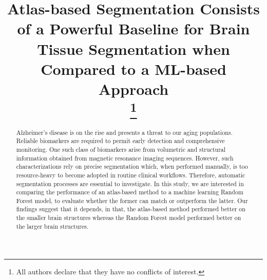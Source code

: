 \documentclass[conference]{IEEEtran}
\begin{document}
\title{Atlas-based Segmentation Consists of a Powerful Baseline for Brain Tissue Segmentation when Compared to a ML-based Approach\\
\thanks{All authors declare that they have no conflicts of interest.}
}

\begin{comment}
\author{\IEEEauthorblockN{Antoine Biebuyck}
\IEEEauthorblockA{\textit{ARTORG Center for BME Research} \\
\textit{Université de Berne}\\
Berne, Suisse \\
antoine.biebuyck@students.unibe.ch}
\and
\IEEEauthorblockN{Nathan Hoffman}
\IEEEauthorblockA{\textit{ARTORG Center for BME Research} \\
\textit{Universität Bern}\\
Bern, Schweiz \\
nathan.hoffman@students.unibe.ch}
\and
\IEEEauthorblockN{Sandro Scherrer}
\IEEEauthorblockA{\textit{ARTORG Center for BME Research} \\
\textit{Università di Berna}\\
Berna, Svizzera \\
sandro.scherrer@students.unibe.ch}
}
\end{comment}

\author{
}

\maketitle

\begin{abstract}
Alzheimer's disease is on the rise and presents a threat to our aging populations. Reliable biomarkers are required to permit early detection and comprehensive monitoring. One such class of biomarkers arise from volumetric and structural information obtained from magnetic resonance imaging sequences. However, such characterizations rely on precise segmentation which, when performed manually, is too resource-heavy to become adopted in routine clinical workflows. Therefore, automatic segmentation processes are essential to investigate. In this study, we are interested in comparing the performance of an atlas-based method to a machine learning Random Forest model, to evaluate whether the former can match or outperform the latter. Our findings suggest that it depends, in that, the atlas-based method performed better on the smaller brain structures whereas the Random Forest model performed better on the larger brain structures.
\end{abstract}
\end{document}
